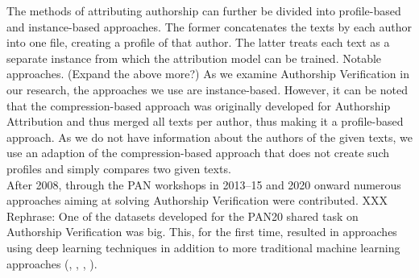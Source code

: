 The methods of attributing authorship can further be divided into profile-based and instance-based approaches.
The former concatenates the texts by each author into one file, creating a profile of that author.
The latter treats each text as a separate instance from which the attribution model can be trained.
Notable approaches.
(Expand the above more?)
As we examine Authorship Verification in our research, the approaches we use are instance-based.
However, it can be noted that the compression-based approach was originally developed for Authorship Attribution and thus merged all texts per author, thus making it a profile-based approach.
As we do not have information about the authors of the given texts, we use an adaption of the compression-based approach that does not create such profiles and simply compares two given texts.\\

After 2008, through the PAN workshops in 2013--15 and 2020 onward numerous approaches aiming at solving Authorship Verification were contributed.
XXX Rephrase:
One of the datasets developed for the PAN20 shared task on Authorship Verification was big.
This, for the first time, resulted in approaches using deep learning techniques in addition to more traditional machine learning approaches (\cite{boenninghoff2020deep}, \cite{weerasinghe2020feature}, \cite{araujo2020siamese}, \cite{ordonez2020will}).







